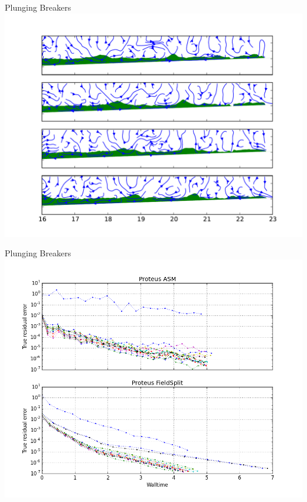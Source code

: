 \documentclass{beamer}
\begin{document}
\begin{frame}{Plunging Breakers}
    \includegraphics[width=\textwidth]{figures/plunging_breakers.pdf}
\end{frame}

\begin{frame}{Plunging Breakers}
    \includegraphics[width=\textwidth]{figures/plunging_comparison.png}
\end{frame}
\end{document}
